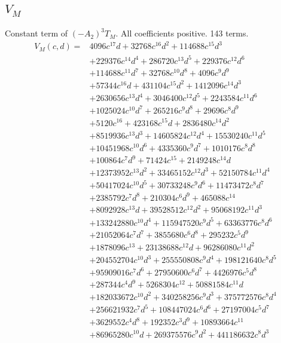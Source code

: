 \subsection*{$V_M$}
Constant term of $(-A_2)^3T_M$. All coefficients positive. 143 terms.
{\small
\begin{align*}
V_M(c,d)={}&4096c^{17}d+32768c^{16}d^{2}+114688c^{15}d^{3}\\
&+229376c^{14}d^{4}+286720c^{13}d^{5}+229376c^{12}d^{6}\\
&+114688c^{11}d^{7}+32768c^{10}d^{8}+4096c^{9}d^{9}\\
&+57344c^{16}d+431104c^{15}d^{2}+1412096c^{14}d^{3}\\
&+2630656c^{13}d^{4}+3046400c^{12}d^{5}+2243584c^{11}d^{6}\\
&+1025024c^{10}d^{7}+265216c^{9}d^{8}+29696c^{8}d^{9}\\
&+5120c^{16}+423168c^{15}d+2836480c^{14}d^{2}\\
&+8519936c^{13}d^{3}+14605824c^{12}d^{4}+15530240c^{11}d^{5}\\
&+10451968c^{10}d^{6}+4335360c^{9}d^{7}+1010176c^{8}d^{8}\\
&+100864c^{7}d^{9}+71424c^{15}+2149248c^{14}d\\
&+12373952c^{13}d^{2}+33465152c^{12}d^{3}+52150784c^{11}d^{4}\\
&+50417024c^{10}d^{5}+30733248c^{9}d^{6}+11473472c^{8}d^{7}\\
&+2385792c^{7}d^{8}+210304c^{6}d^{9}+465088c^{14}\\
&+8092928c^{13}d+39528512c^{12}d^{2}+95068192c^{11}d^{3}\\
&+133242880c^{10}d^{4}+115947520c^{9}d^{5}+63363776c^{8}d^{6}\\
&+21052064c^{7}d^{7}+3855680c^{6}d^{8}+295232c^{5}d^{9}\\
&+1878096c^{13}+23138688c^{12}d+96286080c^{11}d^{2}\\
&+204552704c^{10}d^{3}+255550808c^{9}d^{4}+198121640c^{8}d^{5}\\
&+95909016c^{7}d^{6}+27950600c^{6}d^{7}+4426976c^{5}d^{8}\\
&+287344c^{4}d^{9}+5268304c^{12}+50881584c^{11}d\\
&+182033672c^{10}d^{2}+340258256c^{9}d^{3}+375772576c^{8}d^{4}\\
&+256621932c^{7}d^{5}+108447024c^{6}d^{6}+27197004c^{5}d^{7}\\
&+3629552c^{4}d^{8}+192352c^{3}d^{9}+10893664c^{11}\\
&+86965280c^{10}d+269375576c^{9}d^{2}+441186632c^{8}d^{3}\\

\end{align*}}

